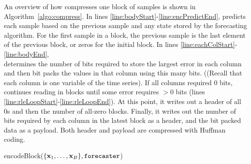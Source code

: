 An overview of how \minesp compresses one block of samples is shown in Algorithm~\ref{algo:compress}. In lines \ref{line:bodyStart}-\ref{line:encPredictEnd}, \minesp predicts each sample based on the previous sample and any state stored by the forecasting algorithm. For the first sample in a block, the previous sample is the last element of the previous block, or zeros for the initial block. In lines \ref{line:eachColStart}-\ref{line:bodyEnd}, \minesp \\ determines the number of bits required to store the largest error in each column and then bit packs the values in that column using this many bits. ((Recall that each column is one variable of the time series). If all columns required 0 bits, \minesp continues reading in blocks until some error requires $>$0 bits (lines \ref{line:rleLoopStart}-\ref{line:rleLoopEnd}). At this point, it writes out a header of all 0s and then the number of all-zero blocks. Finally, it writes out the number of bits required by each column in the latest block as a header, and the bit packed data as a payload. Both header and payload are compressed with Huffman coding.

\begin{algorithm}[h]
\caption{encodeBlock($\{\mathbf{x}_1, \ldots, \mathbf{x}_B \}, \texttt{forecaster}$)}
\label{algo:compress}
\begin{algorithmic}[1]


  \label{line:bodyStart}
     \label{line:encPredictEnd}
\EndFor
{}  \label{line:eachColStart}
      \label{line:bodyEnd}
\EndFor

    \Repeat  {} \label{line:rleLoopStart}
     \label{line:rleLoopEnd}
\EndIf


\end{algorithmic}
\end{algorithm}

